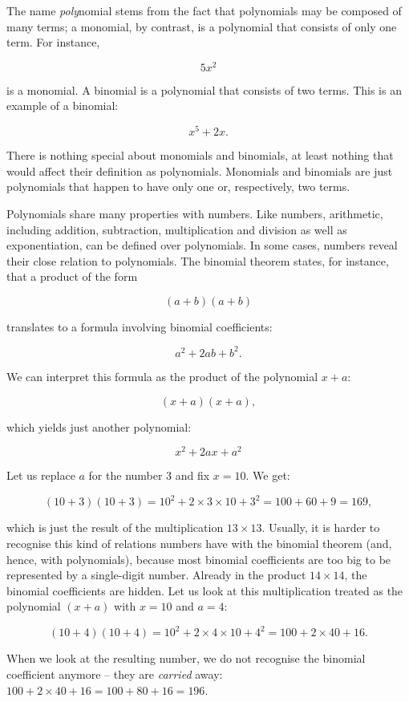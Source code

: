 \documentclass[tikz]{scrreprt}
\begin{document}
The name \emph{poly}nomial stems from the fact
that polynomials may be composed of many terms;
a monomial, by contrast, is a polynomial 
that consists of only one term.
For instance,

\[
5x^2
\]

is a monomial. A binomial is a polynomial
that consists of two terms. This is
an example of a binomial:

\[
x^5 + 2x.
\]

There is nothing special about
monomials and binomials, at least nothing
that would affect their definition as polynomials.
Monomials and binomials are just
polynomials that happen to have only
one or, respectively, two terms.

Polynomials share many properties with numbers.
Like numbers, arithmetic, including
addition, subtraction, multiplication and division
as well as exponentiation, can be defined over polynomials. 
In some cases, numbers reveal their close relation
to polynomials. The binomial theorem states,
for instance, that a product of the form 

\[
(a+b)(a+b)
\]

translates to a formula involving binomial coefficients:

\[
a^2 + 2ab + b^2.
\]

We can interpret this formula as the product 
of the polynomial $x+a$:

\[
(x+a)(x+a),
\]

which yields just another polynomial:

\[
x^2 + 2ax + a^2
\]

Let us replace $a$ for the number 3
and fix $x=10$. We get:

\begin{equation}
(10+3)(10+3) = 10^2 + 2\times 3\times 10 + 3^2 = 100 + 60 + 9 = 169,
\end{equation}

which is just the result of the multiplication $13\times 13$.
Usually, it is harder to recognise this kind of relations 
numbers have with the binomial theorem (and, hence, with polynomials),
because most binomial coefficients are too big to be represented
by a single-digit number. Already in the product $14\times 14$,
the binomial coefficients are hidden. Let us look at this multiplication
treated as the polynomial $(x+a)$ with $x=10$ and $a=4$:

\[
(10 + 4) (10 + 4) = 
10^2 + 2\times 4\times 10 + 4^2 =
100 + 2\times 40 + 16.
\]

When we look at the resulting number, we do not recognise
the binomial coefficient anymore -- they are \emph{carried} away:
$100 + 2\times 40 + 16 = 100 + 80 + 16 = 196$.
\end{document}
